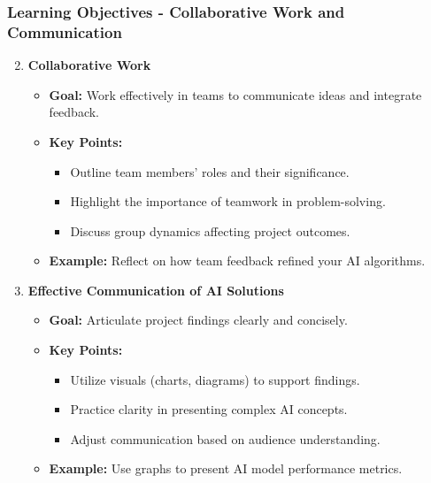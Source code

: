 \documentclass[aspectratio=169]{beamer}
\begin{document}
\begin{frame}[fragile]
    \frametitle{Learning Objectives - Collaborative Work and Communication}
    \begin{enumerate}
        \setcounter{enumi}{1}
        \item \textbf{Collaborative Work}
        \begin{itemize}
            \item \textbf{Goal:} Work effectively in teams to communicate ideas and integrate feedback.
            \item \textbf{Key Points:}
                \begin{itemize}
                    \item Outline team members' roles and their significance.
                    \item Highlight the importance of teamwork in problem-solving.
                    \item Discuss group dynamics affecting project outcomes.
                \end{itemize}
            \item \textbf{Example:} Reflect on how team feedback refined your AI algorithms.
        \end{itemize}
        
        \item \textbf{Effective Communication of AI Solutions}
        \begin{itemize}
            \item \textbf{Goal:} Articulate project findings clearly and concisely.
            \item \textbf{Key Points:}
                \begin{itemize}
                    \item Utilize visuals (charts, diagrams) to support findings.
                    \item Practice clarity in presenting complex AI concepts.
                    \item Adjust communication based on audience understanding.
                \end{itemize}
            \item \textbf{Example:} Use graphs to present AI model performance metrics.
        \end{itemize}
    \end{enumerate}
\end{frame}
\end{document}

